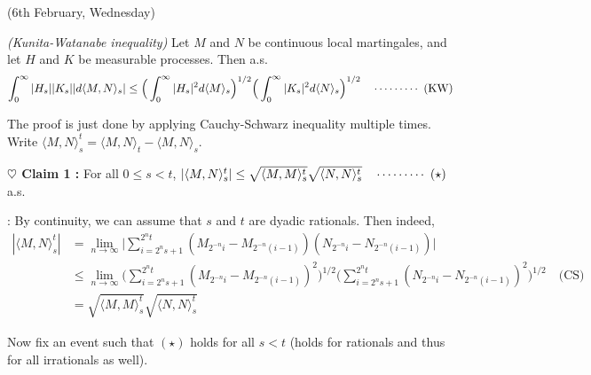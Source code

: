 \documentclass[12pt,a4paper]{article}
\newenvironment{proof}
{\begin{changemargin}{0.5cm}{0.5cm} 
	}%
	{\end{changemargin}
}
\newenvironment{subproof}
{\begin{changemargin}{0.5cm}{0.5cm} 
	}%
	{\end{changemargin}
}
\newenvironment{p}
{\begin{proof} 
	}%
	{\end{proof}
}
\begin{document}
\newday

(6th February, Wednesday)
\s

\prop \emph{(Kunita-Watanabe inequality)} Let $M$ and $N$ be continuous local martingales, and let $H$ and $K$ be measurable processes. Then a.s.
\begin{align*}
\int_0^{\infty} |H_s| |K_s| |d\langle M, N\rangle_s| \leq \Big( \int_{0}^{\infty} |H_s|^2 d\langle M \rangle_s \Big)^{1/2} \Big( \int_{0}^{\infty} |K_s|^2 d\langle N \rangle_s \Big)^{1/2} \quad \cdots\cdots\cdots\,\,(\text{KW})
\end{align*}
\begin{p}
\pf The proof is just done by applying Cauchy-Schwarz inequality multiple times. Write $\langle M, N \rangle_s^t = \langle M, N \rangle_t - \langle M, N \rangle_s$.

\textbf{$\heartsuit$ Claim 1 :} For all $0\leq s <t$, $|\langle M, N \rangle_s^t| \leq \sqrt{\langle M, M \rangle_s^t} \sqrt{\langle N,N \rangle_s^t} \quad \cdots\cdots\cdots\,\,(\star)$ a.s.
\begin{subproof}
: By continuity, we can assume that $s$ and $t$ are dyadic rationals. Then indeed,
\begin{align*}
|\langle M, N \rangle_s^t| &= \lim_{n\rightarrow \infty} \Big| \sum_{i=2^n s+1}^{2^n t}(M_{2^{-n}i} -M_{2^{-n}(i-1)}) (N_{2^{-n}i} -N_{2^{-n}(i-1)})\Big| \\
&\leq \lim_{n\rightarrow \infty} \Big( \sum_{i=2^n s+1}^{2^n t} (M_{2^{-n}i} -M_{2^{-n}(i-1)})^2 \Big)^{1/2} \Big( \sum_{i=2^n s+1}^{2^n t} (N_{2^{-n}i} -N_{2^{-n}(i-1)})^2 \Big)^{1/2} \quad \text{(CS)} \\
&=\sqrt{\langle M, M \rangle_s^t} \sqrt{\langle N,N \rangle_s^t}
\end{align*}
\end{subproof}
Now fix an event such that $(\star)$ holds for all $s<t$ (holds for rationals and thus for all irrationals as well).


\end{p}
\end{document}
